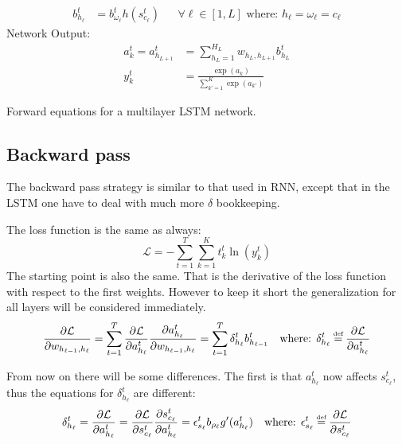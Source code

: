 \begin{equationbox}[H]
\begin{equation*}
\begin{aligned}
b_{h_\ell}^t &= b_{\omega_\ell}^t h(s_{c_\ell}^t) && \forall \ell \in [1, L] \text{ where: } h_\ell = \omega_\ell = c_\ell
\end{aligned}
\end{equation*}
Network Output:
\begin{equation*}
\begin{aligned}
a_k^t = a_{h_{L+1}}^t &= \sum_{h_L=1}^{H_L} w_{h_L, h_{L+1}} b_{h_L}^t \\
y_k^t &= \frac{\exp(a_k)}{\sum_{k'=1}^K \exp(a_{k'})}
\end{aligned}
\end{equation*}
\caption{Forward equations for a multilayer LSTM network.}
\end{equationbox}

\newpage
\subsection{Backward pass}

The backward pass strategy is similar to that used in RNN, except that in the LSTM one have to deal with much more $\delta$ bookkeeping.

The loss function is the same as always:
\begin{equation}
\mathcal{L} = - \sum_{t=1}^T \sum_{k=1}^K t_k^t \ln(y_k^t)
\end{equation}
The starting point is also the same. That is the derivative of the loss function with respect to the first weights. However to keep it short the generalization for all layers will be considered immediately.
\begin{equation}
\frac{\partial \mathcal{L}}{\partial w_{h_{\ell-1}, h_\ell}}
= \sum_{t=1}^T \frac{\partial \mathcal{L}}{\partial a_{h_\ell}^t} \frac{\partial a_{h_\ell}^t}{\partial w_{h_{\ell-1}, h_\ell}}
= \sum_{t=1}^T \delta_{h_\ell}^t b_{h_{\ell-1}}^t
\quad \text{where: } \delta_{h_\ell}^t \defeq \frac{\partial \mathcal{L}}{\partial a_{h_\ell}^t}
\end{equation}

From now on there will be some differences. The first is that $a_{h_\ell}^t$ now affects $s_{c_\ell}^t$, thus the equations for $\delta_{h_\ell}^t$ are different:
\begin{equation}
\delta_{h_\ell}^t
= \frac{\partial \mathcal{L}}{\partial a_{h_\ell}^t}
= \frac{\partial \mathcal{L}}{\partial s_{c_\ell}^t} \frac{\partial s_{c_\ell}^t}{\partial a_{h_\ell}^t}
= \epsilon_{s_\ell}^t b_{\rho_\ell}{g'(a_{h_\ell}^t)}
\quad \text{where: } \epsilon_{s_\ell}^t \defeq \frac{\partial \mathcal{L}}{\partial s_{c_\ell}^t}
\end{equation}

